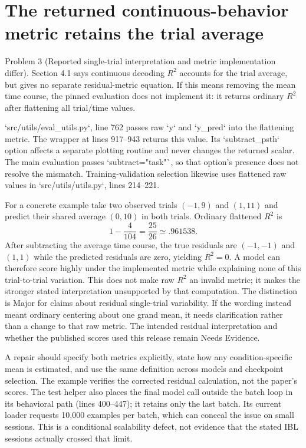 \documentclass[10pt]{article}
\begin{document}
\section*{The returned continuous-behavior metric retains the trial average}
Problem 3 (Reported single-trial interpretation and metric implementation differ).  Section 4.1 says continuous decoding \(R^2\) accounts for the trial average, but gives no separate residual-metric equation. If this means removing the mean time course, the pinned evaluation does not implement it: it returns ordinary \(R^2\) after flattening all trial/time values.\par
`src/utils/eval\_utils.py`, line 762 passes raw `y` and `y\_pred` into the flattening metric. The wrapper at lines 917–943 returns this value. Its `subtract\_psth` option affects a separate plotting routine and never changes the returned scalar. The main evaluation passes `subtract="task"`, so that option’s presence does not resolve the mismatch. Training-validation selection likewise uses flattened raw values in `src/utils/utils.py`, lines 214–221.\par
For a concrete example take two observed trials \((-1,9)\) and \((1,11)\) and predict their shared average \((0,10)\) in both trials. Ordinary flattened \(R^2\) is \[1-\frac{4}{104}=\frac{25}{26}\simeq .961538.\] After subtracting the average time course, the true residuals are \((-1,-1)\) and \((1,1)\) while the predicted residuals are zero, yielding \(R^2=0\). A model can therefore score highly under the implemented metric while explaining none of this trial-to-trial variation. This does not make raw \(R^2\) an invalid metric; it makes the stronger stated interpretation unsupported by that computation. The distinction is Major for claims about residual single-trial variability. If the wording instead meant ordinary centering about one grand mean, it needs clarification rather than a change to that raw metric. The intended residual interpretation and whether the published scores used this release remain Needs Evidence.\par
A repair should specify both metrics explicitly, state how any condition-specific mean is estimated, and use the same definition across models and checkpoint selection. The example verifies the corrected residual calculation, not the paper’s scores. The test helper also places the final model call outside the batch loop in its behavioral path (lines 400–447); it retains only the last batch. Its current loader requests 10,000 examples per batch, which can conceal the issue on small sessions. This is a conditional scalability defect, not evidence that the stated IBL sessions actually crossed that limit.\par
\end{document}
